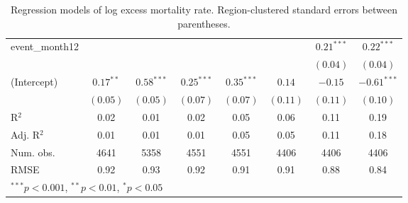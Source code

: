 \begin{table}
\begin{center}
\begin{tabular}{l c c c c c c c }
event\_month12       &              &              &              &              &              & $0.21^{***}$ & $0.22^{***}$  \\
                     &              &              &              &              &              & $(0.04)$     & $(0.04)$      \\
(Intercept)          & $0.17^{**}$  & $0.58^{***}$ & $0.25^{***}$ & $0.35^{***}$ & $0.14$       & $-0.15$      & $-0.61^{***}$ \\
                     & $(0.05)$     & $(0.05)$     & $(0.07)$     & $(0.07)$     & $(0.11)$     & $(0.11)$     & $(0.10)$      \\
\hline
R$^2$                & 0.02         & 0.01         & 0.02         & 0.05         & 0.06         & 0.11         & 0.19          \\
Adj. R$^2$           & 0.01         & 0.01         & 0.01         & 0.05         & 0.05         & 0.11         & 0.18          \\
Num. obs.            & 4641         & 5358         & 4551         & 4551         & 4406         & 4406         & 4406          \\
RMSE                 & 0.92         & 0.93         & 0.92         & 0.91         & 0.91         & 0.88         & 0.84          \\
\hline
\multicolumn{8}{l}{\scriptsize{$^{***}p<0.001$, $^{**}p<0.01$, $^*p<0.05$}}
\end{tabular}
\caption{Regression models of log excess mortality rate. Region-clustered standard errors between parentheses.}
\label{tab:basemodels}
\end{center}
\end{table}
